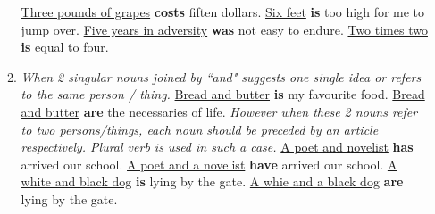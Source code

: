 \begin{enumerate}
\begin{enumerate}
                \newline
                \newline
                \underline{Three pounds of grapes} \textbf{costs} fiften dollars.
                \newline
                \newline
                \underline{Six feet} \textbf{is} too high for me to jump over.
                \newline
                \newline
                \underline{Five years in adversity} \textbf{was} not easy to endure.
                \newline
                \newline
                \underline{Two times two} \textbf{is} equal to four.
            \item {\it When 2 singular nouns joined by ``and" suggests one
                single idea or refers to the same person / thing.}
                \newline
                \newline
                \underline{Bread and butter} \textbf{is} my favourite food.
                \newline
                \underline{Bread and butter} \textbf{are} the necessaries of
                life.
                \newline
                \newline
                {\it However when these 2 nouns refer to two persons/things,
                each noun should be preceded by an article respectively. Plural
                verb is used in such a case.}
                \newline
                \newline
                \underline{A poet and novelist} \textbf{has} arrived our school.
                \newline
                \underline{A poet and a novelist} \textbf{have} arrived our
                school.
                \newline
                \newline
                \underline{A white and black dog} \textbf{is} lying by the gate.
                \newline
                \underline{A whie and a black dog} \textbf{are} lying by the
                gate.
                \newline
                \newline

\end{enumerate}
\end{enumerate}
